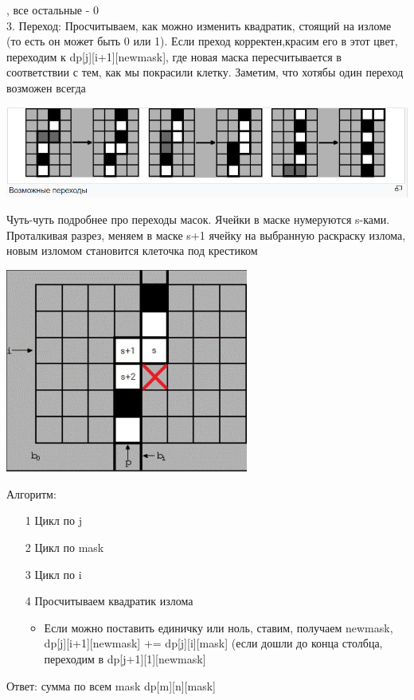 , все остальные - 0\\
3. Переход: Просчитываем, как можно изменить квадратик, стоящий на изломе (то есть он может быть 0 или 1). Если преход корректен,красим его в этот цвет, переходим к dp[j][i+1][newmask], где новая маска пересчитывается в соответствии с тем, как мы покрасили клетку. Заметим, что хотябы один переход возможен всегда
\begin{center}
    \includegraphics[width=17cm]{images/18-24_alg25.PNG}
\end{center}
Чуть-чуть подробнее про переходы масок. Ячейки в маске нумеруются s-ками. Проталкивая разрез, меняем в маске s+1 ячейку на выбранную раскраску излома, новым изломом становится клеточка под крестиком
\begin{center}
    \includegraphics[width=8cm]{images/18-24_alg26.PNG}
\end{center}
Алгоритм:
\begin{itemize}
    \item [1] Цикл по j
    \item [2] Цикл по mask
    \item [3] Цикл по i
    \item [4] Просчитываем квадратик излома
    \begin{itemize}
        \item Если можно поставить единичку или ноль, ставим, получаем newmask, dp[j][i+1][newmask] +=  dp[j][i][mask] (если дошли до конца столбца, переходим в  dp[j+1][1][newmask]
        
    \end{itemize}
\end{itemize}
Ответ: сумма по всем mask dp[m][n][mask]